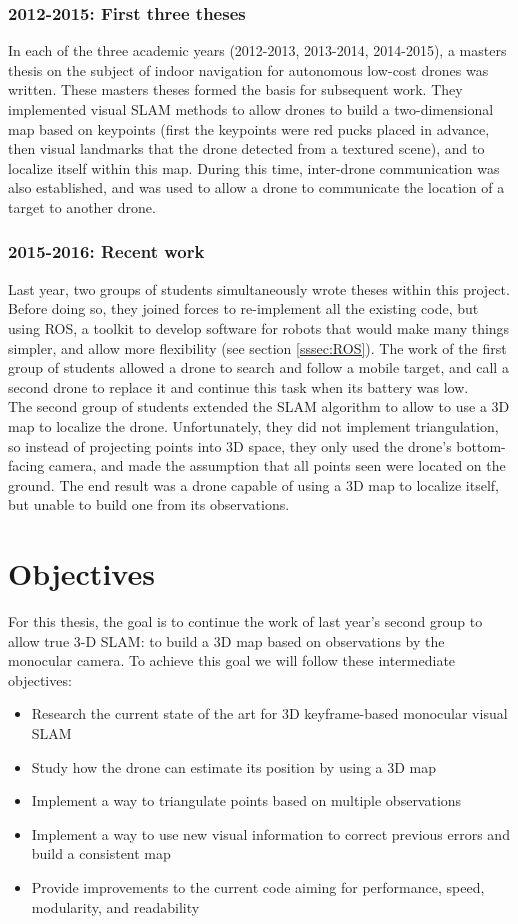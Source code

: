 \subsubsection{2012-2015: First three theses}
In each of the three academic years (2012-2013, 2013-2014, 2014-2015), a masters thesis on the subject of indoor navigation for autonomous low-cost drones was written. These masters theses formed the basis for subsequent work. They implemented visual SLAM methods to allow drones to build a two-dimensional map based on keypoints (first the keypoints were red pucks placed in advance, then visual landmarks that the drone detected from a textured scene), and to localize itself within this map. During this time, inter-drone communication was also established, and was used to allow a drone to communicate the location of a target to another drone.

\subsubsection{2015-2016: Recent work}
Last year, two groups of students simultaneously wrote theses within this project. Before doing so, they joined forces to re-implement all the existing code, but using ROS, a toolkit to develop software for robots that would make many things simpler, and allow more flexibility (see section \ref{sssec:ROS}).
The work of the first group of students allowed a drone to search and follow a mobile target, and call a second drone to replace it and continue this task when its battery was low.\\

The second group of students extended the SLAM algorithm to allow to use a 3D map to localize the drone. Unfortunately, they did not implement triangulation, so instead of projecting points into 3D space, they only used the drone's bottom-facing camera, and made the assumption that all points seen were located on the ground. The end result was a drone capable of using a 3D map to localize itself, but unable to build one from its observations.


\section{Objectives}
For this thesis, the goal is to continue the work of last year's second group to allow true 3-D SLAM: to build a 3D map based on observations by the monocular camera. To achieve this goal we will follow these intermediate objectives:
\begin{itemize}
\item Research the current state of the art for 3D keyframe-based monocular visual SLAM
\item Study how the drone can estimate its position by using a 3D map
\item Implement a way to triangulate points based on multiple observations
\item Implement a way to use new visual information to correct previous errors and build a consistent map
\item Provide improvements to the current code aiming for performance, speed, modularity, and readability
\end{itemize}


